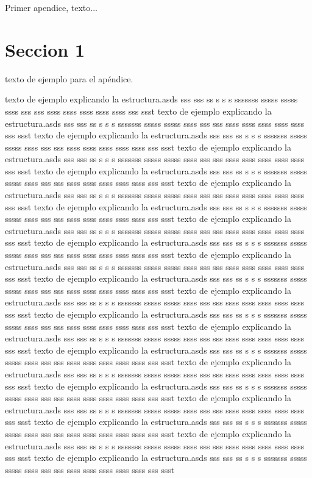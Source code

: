 Primer apendice, texto...

\section{Seccion 1}
texto de ejemplo para el apéndice.

texto de ejemplo explicando la estructura.asds sss sss ss s s s sssssss sssss sssss ssss sss sss ssss ssss ssss ssss ssss sss ssst texto de ejemplo explicando la estructura.asds sss sss ss s s s sssssss sssss sssss ssss sss sss ssss ssss ssss ssss ssss sss ssst texto de ejemplo explicando la estructura.asds sss sss ss s s s sssssss sssss sssss ssss sss sss ssss ssss ssss ssss ssss sss ssst texto de ejemplo explicando la estructura.asds sss sss ss s s s sssssss sssss sssss ssss sss sss ssss ssss ssss ssss ssss sss ssst texto de ejemplo explicando la estructura.asds sss sss ss s s s sssssss sssss sssss ssss sss sss ssss ssss ssss ssss ssss sss ssst texto de ejemplo explicando la estructura.asds sss sss ss s s s sssssss sssss sssss ssss sss sss ssss ssss ssss ssss ssss sss ssst texto de ejemplo explicando la estructura.asds sss sss ss s s s sssssss sssss sssss ssss sss sss ssss ssss ssss ssss ssss sss ssst texto de ejemplo explicando la estructura.asds sss sss ss s s s sssssss sssss sssss ssss sss sss ssss ssss ssss ssss ssss sss ssst texto de ejemplo explicando la estructura.asds sss sss ss s s s sssssss sssss sssss ssss sss sss ssss ssss ssss ssss ssss sss ssst texto de ejemplo explicando la estructura.asds sss sss ss s s s sssssss sssss sssss ssss sss sss ssss ssss ssss ssss ssss sss ssst texto de ejemplo explicando la estructura.asds sss sss ss s s s sssssss sssss sssss ssss sss sss ssss ssss ssss ssss ssss sss ssst texto de ejemplo explicando la estructura.asds sss sss ss s s s sssssss sssss sssss ssss sss sss ssss ssss ssss ssss ssss sss ssst texto de ejemplo explicando la estructura.asds sss sss ss s s s sssssss sssss sssss ssss sss sss ssss ssss ssss ssss ssss sss ssst texto de ejemplo explicando la estructura.asds sss sss ss s s s sssssss sssss sssss ssss sss sss ssss ssss ssss ssss ssss sss ssst texto de ejemplo explicando la estructura.asds sss sss ss s s s sssssss sssss sssss ssss sss sss ssss ssss ssss ssss ssss sss ssst texto de ejemplo explicando la estructura.asds sss sss ss s s s sssssss sssss sssss ssss sss sss ssss ssss ssss ssss ssss sss ssst texto de ejemplo explicando la estructura.asds sss sss ss s s s sssssss sssss sssss ssss sss sss ssss ssss ssss ssss ssss sss ssst texto de ejemplo explicando la estructura.asds sss sss ss s s s sssssss sssss sssss ssss sss sss ssss ssss ssss ssss ssss sss ssst texto de ejemplo explicando la estructura.asds sss sss ss s s s sssssss sssss sssss ssss sss sss ssss ssss ssss ssss ssss sss ssst texto de ejemplo explicando la estructura.asds sss sss ss s s s sssssss sssss sssss ssss sss sss ssss ssss ssss ssss ssss sss ssst texto de ejemplo explicando la estructura.asds sss sss ss s s s sssssss sssss sssss ssss sss sss ssss ssss ssss ssss ssss sss ssst 